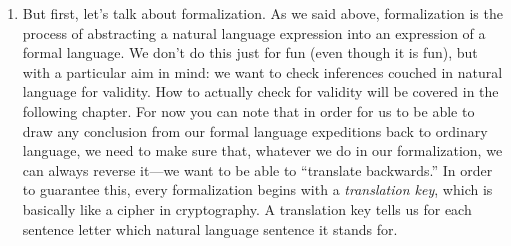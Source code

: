\begin{enumerate}[\thesection.1]
\begin{proof}
	Only in case (a), we need to reason a bit more. We again easily get from $\phi,\psi\in Y$ to $\phi,\psi\in X$ and from there via (ii.b) to $(\phi\land\psi)\in X$. But can $(\phi\land\psi)$ be in $\{(p\land \neg), \neg\}$? Well, only if $\phi=p$ and $\psi=\neg$. But remember that $\psi\in Y=X\setminus \{(p\land \neg), \neg\}$. Hence if $\psi=\neg$, then $\psi\notin Y$, which contradicts our assumption that $\psi\in Y$. Hence, using proof by contradiction, we can conclude that $(\phi\land\psi)\notin\{(p\land \neg), \neg\}$. Hence $(\phi\land\psi)\in Y$, as desired.
	
	So, if $X$ satisfies (i) and (ii) and $(p\land \neg)\in X$, then $X$ is not the smallest set that satisfies conditions (i) and (ii). Hence $X\neq \mathcal{L}$. For a final proof by contradiction, suppose that $(p\land \neg)\in\mathcal{L}$. By our observation, it would follow that $\mathcal{L}\neq\mathcal{L}$, which is a contradiction. Hence $(p\land \neg)\notin\mathcal{L}$.
	
	\end{proof}
	
	As you can see, it's quite tedious to show that something isn't a formula. In the following, we'll develop some techniques for proving that expressions aren't formulas that are a bit more ``user friendly.''
		
	\item But first, let's talk about formalization. As we said above, formalization is the process of abstracting a natural language expression into an expression of a formal language. We don't do this just for fun (even though it is fun), but with a particular aim in mind: we want to check inferences couched in natural language for validity. How to actually check for validity will be covered in the following chapter. For now you can note that in order for us to be able to draw any conclusion from our formal language expeditions back to ordinary language, we need to make sure that, whatever we do in our formalization, we can always reverse it---we want to be able to ``translate backwards.'' In order to guarantee this, every formalization begins with a \emph{translation key}, which is basically like a cipher in cryptography. A translation key tells us for each sentence letter which natural language sentence it stands for. 
	

\end{enumerate}
